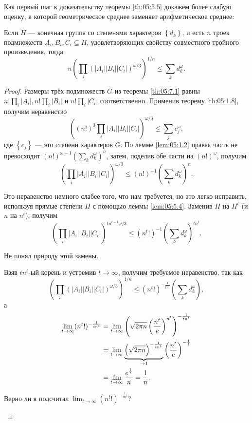 Как первый шаг к доказательству теоремы \ref{th:05:5.5} докажем более слабую оценку, в которой геометрическое среднее заменяет арифметическое среднее:
\begin{lemma}
  \label{lem:05:7.2} Если $H$ --- конечная группа со степенями характеров $\left\{ d_k \right\}$, и есть $n$ троек подмножеств $A_i, B_i, C_i \subseteq H$, удовлетворяющих свойству совместного тройного произведения, тогда
  \[
  	n \left( \prod_i (|A_i| |B_i| |C_i|)^{\omega/3} \right)^{1/n} \leq \sum_k d_k^\omega.
  \]
\end{lemma}
\begin{proof}
  Размеры трёх подмножеств $G$ из теоремы \ref{th:05:7.1} равны $n!\prod_i |A_i|, n!\prod_i |B_i|$ и $n!\prod_i |C_i|$ соответственно. Применив теорему \ref{th:05:1.8}, получим неравенство
  \[
  	\left((n!)^3 \prod_i |A_i| |B_i| |C_i|\right)^{\omega/3} \leq \sum_j c_j^\omega,
  \]
  где $\left\{ c_j \right\}$ --- это степени характеров $G$.  По лемме \ref{lem:05:1.2} правая часть не превосходит $(n!)^{\omega-1} \left( \sum_k d_k^\omega \right)^n$, затем, поделив обе части на $(n!)^\omega$, получим
  \[
  	\left(\prod_i |A_i| |B_i| |C_i|\right)^{\omega/3} \leq (n!)^{-1} \left( \sum_k d_k^\omega \right)^n.	
  \]
  
  Это неравенство немного слабее того, что нам требуется, но это легко исправить, используя прямые степени $H$ с помощью леммы \ref{lem:05:5.4}. Заменив $H$ на $H^t$ (и $n$ на $n^t$), получим
  \[
  	\left(\prod_i |A_i| |B_i| |C_i|\right)^{t n^{t-1} \omega/3} \leq (n^t!)^{-1} \left( \sum_k d_k^\omega \right)^{t n^t}.
  \]
  \begin{question}
    Не понял природу этой замены. 
  \end{question}
  Взяв $t n^t$-ый корень и устремив $t \to \infty$, получим требуемое неравенство, так как
  \[
  	\left(\prod_i (|A_i| |B_i| |C_i|)^{\omega/3}\right)^{1/n} \leq (n^t!)^{-\frac{1}{t n^t}} \left( \sum_k d_k^\omega \right),
  \]
  а 
  \begin{align*}
       \lim_{t \to \infty} (n^t!)^{-\frac{1}{t n^t}} & = \lim_{t \to \infty} \left( \sqrt{2 \pi n} \left( \frac{n^t}{e} \right)^{n^t} \right)^{-\frac{1}{t n^t}}\\
       & = \lim_{t \to \infty} \underbrace{\left(\sqrt{2 \pi n}\right)^{-\frac{1}{t n^t}}}_{\to 1} \left( \frac{n^t}{e} \right)^{-\frac{1}{t}}\\
       & = \lim_{t \to \infty} \frac{e^{\frac{1}{t}}}{n} = \frac{1}{n}. \qedhere
  \end{align*}
  \begin{question}
    Верно ли я подсчитал $\lim_{t \to \infty} (n^t!)^{-\frac{1}{t n^t}}$?
  \end{question}
\end{proof}

